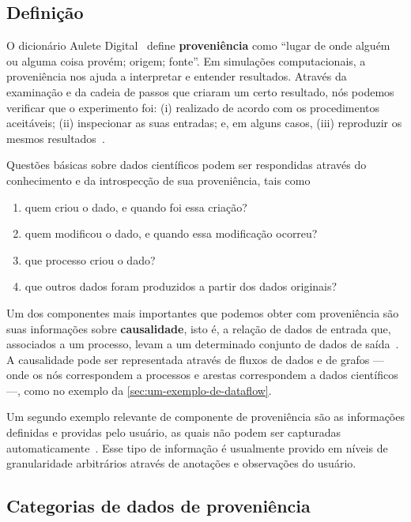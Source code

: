 \subsection{Definição}

O dicionário Aulete Digital~\cite{aulete2014dicionario} define \textbf{proveniência} como
``lugar de onde alguém ou alguma coisa provém; origem; fonte''. Em simulações computacionais, a proveniência nos ajuda a interpretar e entender resultados. Através da examinação e da cadeia de passos que criaram um certo resultado, nós podemos verificar que o experimento foi: (i) realizado de acordo com os procedimentos aceitáveis; (ii) inspecionar as suas entradas; e, em alguns casos, (iii) reproduzir os mesmos resultados~\cite{freire2008provenance}.

Questões básicas sobre dados científicos podem ser respondidas através do conhecimento e da introspecção de sua proveniência, tais como

\begin{enumerate}
    \item quem criou o dado, e quando foi essa criação?
    \item quem modificou o dado, e quando essa modificação ocorreu?
    \item que processo criou o dado?
    \item que outros dados foram produzidos a partir dos dados originais?
\end{enumerate}

Um dos componentes mais importantes que podemos obter com proveniência são suas informações sobre \textbf{causalidade}, isto é, a relação de dados de entrada que, associados a um processo, levam a um determinado conjunto de dados de saída~\cite{freire2008provenance}. A causalidade pode ser representada através de fluxos de dados e de grafos --- onde os nós correspondem a processos e arestas correspondem a dados científicos ---, como no exemplo da \autoref{sec:um-exemplo-de-dataflow}.

Um segundo exemplo relevante de componente de proveniência são as informações definidas e providas pelo usuário, as quais não podem ser capturadas automaticamente~\cite{freire2008provenance}. Esse tipo de informação é usualmente provido em níveis de granularidade arbitrários através de anotações e observações do usuário.

\subsection{Categorias de dados de proveniência}

